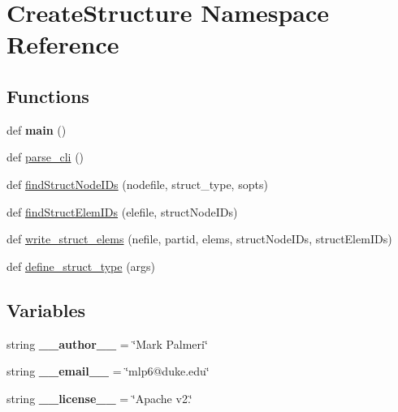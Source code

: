\hypertarget{namespaceCreateStructure}{}\section{Create\+Structure Namespace Reference}
\label{namespaceCreateStructure}
\subsection*{Functions}
\begin{DoxyCompactItemize}
\item 
\hypertarget{namespaceCreateStructure_a57d4ef83537d7827ccc0b7ce38e6ed71}{}def {\bfseries main} ()\label{namespaceCreateStructure_a57d4ef83537d7827ccc0b7ce38e6ed71}

\item 
def \hyperlink{namespaceCreateStructure_a87cbbc5a5918740c6829e09d30e559f9}{parse\+\_\+cli} ()
\item 
def \hyperlink{namespaceCreateStructure_adb8b4bdc9bf91c9a387292212c3442d2}{find\+Struct\+Node\+I\+Ds} (nodefile, struct\+\_\+type, sopts)
\item 
def \hyperlink{namespaceCreateStructure_a5024d9dcd58c4608f6b1f60f4b7137c3}{find\+Struct\+Elem\+I\+Ds} (elefile, struct\+Node\+I\+Ds)
\item 
def \hyperlink{namespaceCreateStructure_af9bec4cba8ad21e2c1bc76d814c5e195}{write\+\_\+struct\+\_\+elems} (nefile, partid, elems, struct\+Node\+I\+Ds, struct\+Elem\+I\+Ds)
\item 
def \hyperlink{namespaceCreateStructure_aa11f8b9be9a8d76084888cf502131db3}{define\+\_\+struct\+\_\+type} (args)
\end{DoxyCompactItemize}
\subsection*{Variables}
\begin{DoxyCompactItemize}
\item 
\hypertarget{namespaceCreateStructure_af899f84eadfd33b75fcb445284af33ee}{}string {\bfseries \+\_\+\+\_\+author\+\_\+\+\_\+} = \char`\"{}Mark Palmeri\char`\"{}\label{namespaceCreateStructure_af899f84eadfd33b75fcb445284af33ee}

\item 
\hypertarget{namespaceCreateStructure_a47fde5fe18b96e7c414f7ce0ed9becab}{}string {\bfseries \+\_\+\+\_\+email\+\_\+\+\_\+} = \char`\"{}mlp6@duke.\+edu\char`\"{}\label{namespaceCreateStructure_a47fde5fe18b96e7c414f7ce0ed9becab}

\item 
\hypertarget{namespaceCreateStructure_a11f329784c7441166b757bac532d3fef}{}string {\bfseries \+\_\+\+\_\+license\+\_\+\+\_\+} = \char`\"{}Apache v2.\char`\"{}\label{namespaceCreateStructure_a11f329784c7441166b757bac532d3fef}

\end{DoxyCompactItemize}


